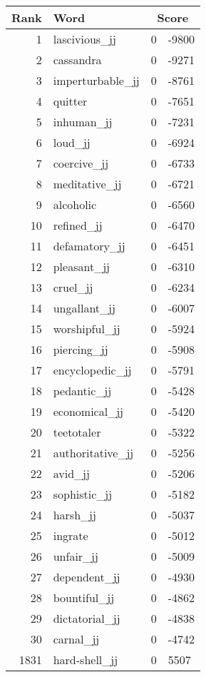 \begin{longtable}[!htbp]{| rlr@{.}l |}
    \hline
    \textbf{Rank} & \textbf{Word} & \multicolumn{2}{c|}{\textbf{Score}} \\
    \hline
    \endhead
    1 & lascivious\_jj & 0 & -9800 \\
    2 & cassandra & 0 & -9271 \\
    3 & imperturbable\_jj & 0 & -8761 \\
    4 & quitter & 0 & -7651 \\
    5 & inhuman\_jj & 0 & -7231 \\
    6 & loud\_jj & 0 & -6924 \\
    7 & coercive\_jj & 0 & -6733 \\
    8 & meditative\_jj & 0 & -6721 \\
    9 & alcoholic & 0 & -6560 \\
    10 & refined\_jj & 0 & -6470 \\
    11 & defamatory\_jj & 0 & -6451 \\
    12 & pleasant\_jj & 0 & -6310 \\
    13 & cruel\_jj & 0 & -6234 \\
    14 & ungallant\_jj & 0 & -6007 \\
    15 & worshipful\_jj & 0 & -5924 \\
    16 & piercing\_jj & 0 & -5908 \\
    17 & encyclopedic\_jj & 0 & -5791 \\
    18 & pedantic\_jj & 0 & -5428 \\
    19 & economical\_jj & 0 & -5420 \\
    20 & teetotaler & 0 & -5322 \\
    21 & authoritative\_jj & 0 & -5256 \\
    22 & avid\_jj & 0 & -5206 \\
    23 & sophistic\_jj & 0 & -5182 \\
    24 & harsh\_jj & 0 & -5037 \\
    25 & ingrate & 0 & -5012 \\
    26 & unfair\_jj & 0 & -5009 \\
    27 & dependent\_jj & 0 & -4930 \\
    28 & bountiful\_jj & 0 & -4862 \\
    29 & dictatorial\_jj & 0 & -4838 \\
    30 & carnal\_jj & 0 & -4742 \\
    1831 & hard-shell\_jj & 0 & 5507 \\

\end{longtable}
